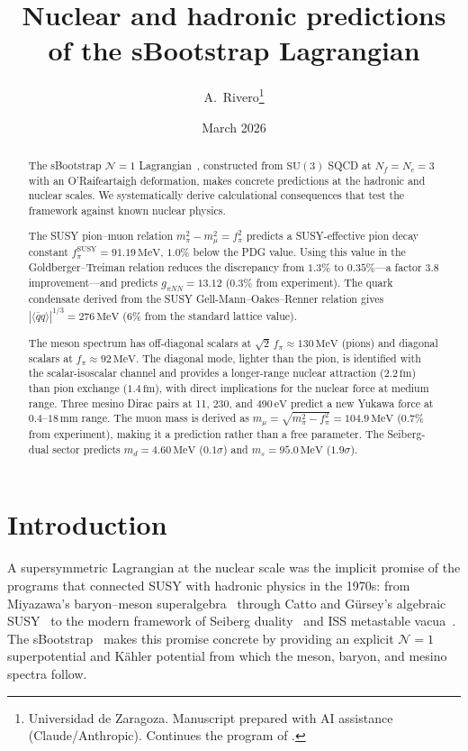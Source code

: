 \documentclass[12pt,a4paper]{article}
\title{Nuclear and hadronic predictions of the sBootstrap Lagrangian}
\author{A.~Rivero\thanks{Universidad de Zaragoza.
Manuscript prepared with AI assistance (Claude/Anthropic).
Continues the program of \cite{Rivero2005}.}}
\date{March 2026}
\newcommand{\MeV}{\,\text{MeV}}
\newcommand{\eV}{\,\text{eV}}
\newcommand{\fpi}{f_\pi}
\newcommand{\qqbar}{\langle\bar{q}q\rangle}
\begin{document}
\maketitle

\begin{abstract}
The sBootstrap $\mathcal{N}=1$ Lagrangian~\cite{paperIII}, constructed from
$\mathrm{SU}(3)$ SQCD at $N_f = N_c = 3$ with an O'Raifeartaigh
deformation, makes concrete predictions at the hadronic and nuclear scales.
We systematically derive calculational consequences that test the
framework against known nuclear physics.

The SUSY pion--muon relation $m_\pi^2 - m_\mu^2 = \fpi^2$ predicts a
SUSY-effective pion decay constant $\fpi^{\text{SUSY}} = 91.19\MeV$,
$1.0\%$ below the PDG value.  Using this value in the
Goldberger--Treiman relation reduces the discrepancy from
$1.3\%$ to $0.35\%$---a factor 3.8 improvement---and predicts
$g_{\pi NN} = 13.12$ ($0.3\%$ from experiment).  The quark condensate
derived from the SUSY Gell-Mann--Oakes--Renner relation gives
$|\qqbar|^{1/3} = 276\MeV$ ($6\%$ from the standard lattice value).

The meson spectrum has off-diagonal scalars at $\sqrt{2}\,\fpi \approx
130\MeV$ (pions) and diagonal scalars at $\fpi \approx 92\MeV$.
The diagonal mode, lighter than the pion, is identified with the
scalar-isoscalar channel and provides a longer-range nuclear attraction
($2.2\,\text{fm}$) than pion exchange ($1.4\,\text{fm}$), with
direct implications for the nuclear force at medium range.
Three mesino Dirac pairs at 11, 230, and 490$\eV$ predict a new
Yukawa force at $0.4$--$18\,\text{mm}$ range.  The muon mass is
derived as $m_\mu = \sqrt{m_\pi^2 - \fpi^2} = 104.9\MeV$ ($0.7\%$
from experiment), making it a prediction rather than a free parameter.
The Seiberg-dual sector predicts $m_d = 4.60\MeV$ ($0.1\sigma$)
and $m_s = 95.0\MeV$ ($1.9\sigma$).
\end{abstract}

\section{Introduction}

A supersymmetric Lagrangian at the nuclear scale was the implicit
promise of the programs that connected SUSY with hadronic
physics in the 1970s: from Miyazawa's baryon--meson
superalgebra~\cite{Miyazawa} through Catto and G\"ursey's
algebraic SUSY~\cite{CattoGursey} to the modern framework of
Seiberg duality~\cite{Seiberg1995} and ISS metastable
vacua~\cite{ISS2006}.  The sBootstrap~\cite{Rivero2005} makes this
promise concrete by providing an explicit $\mathcal{N}=1$
superpotential and K\"ahler potential from which the meson, baryon,
and mesino spectra follow.
\end{document}
